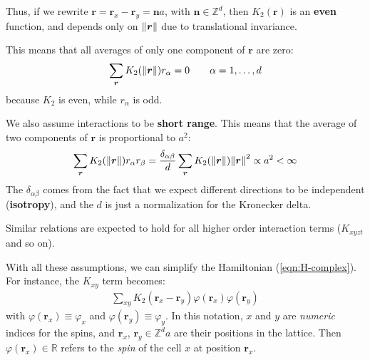 \documentclass[../../main.tex]{subfiles}
\begin{document}
Thus, if we rewrite $\bm{r} = \bm{r}_x - \bm{r}_y = \bm{n} a$, with $\bm{n} \in \mathbb{Z}^d$, then $K_2(\bm{r})$ is an \textbf{even} function, and depends only on $\norm{\bm{r}}$ due to translational invariance.

This means that all averages of only one component of $\bm{r}$ are zero:
\begin{align}\label{eqn:r-average}
    \sum_{\bm{r}} K_2(\norm{\bm{r}}) r_\alpha = 0 \qquad \alpha=1,\dots,d
\end{align}
because $K_2$ is even, while $r_\alpha$ is odd.

\medskip

We also assume interactions to be \textbf{short range}. This means that the average of two components of $\bm{r}$ is proportional to $a^2$: 
\begin{align}\label{eqn:rr-average}
    \sum_{\bm{r}} K_2(\norm{\bm{r}}) r_\alpha r_\beta = \frac{\delta_{\alpha \beta}}{d}  \sum_{\bm{r}} K_2(\norm{\bm{r}}) \norm{\bm{r}}^2 \propto a^2 < \infty
\end{align} 
The $\delta_{\alpha \beta}$ comes from the fact that we expect different directions to be independent (\textbf{isotropy}), and the $d$ is just a normalization for the Kronecker delta.

\medskip

Similar relations are expected to hold for all higher order interaction terms ($K_{xyzt}$ and so on).

\medskip

With all these assumptions, we can simplify the Hamiltonian (\ref{eqn:H-complex}). For instance, the $K_{xy}$ term becomes:
\begin{align*}
    \sum_{xy} K_2(\bm{r}_x - \bm{r}_y) \varphi(\bm{r}_x) \varphi(\bm{r}_y)
\end{align*}
with $\varphi(\bm{r}_x) \equiv \varphi_x$ and $\varphi(\bm{r}_y) \equiv \varphi_y$. In this notation, $x$ and $y$ are \textit{numeric} indices for the spins, and $\bm{r}_x$, $\bm{r}_y \in \mathbb{Z}^d a$ are their positions in the lattice. Then $\varphi(\bm{r}_x) \in \mathbb{R}$ refers to the \textit{spin} of the cell $x$ at position $\bm{r}_x$. 

\medskip
\end{document}
